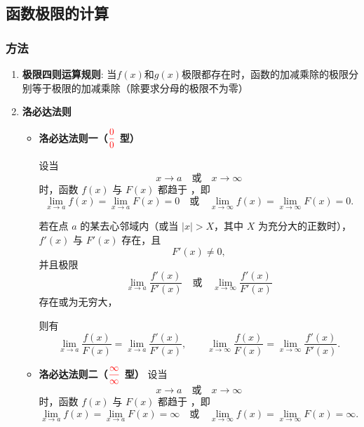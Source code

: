 \documentclass[../book.tex]{subfiles}
\begin{document}
    \subsection{函数极限的计算}

    \subsubsection{方法}

    \begin{enumerate}
        \item \textbf{极限四则运算规则}: 当$f(x)$和$g(x)$极限都存在时，函数的加减乘除的极限分别等于极限的加减乘除（除要求分母的极限不为零）
        \item \textbf{洛必达法则}
        \begin{itemize}
            \item \textbf{洛必达法则一（$\color{red}{\dfrac{0}{0}}$ 型）}

            设当
            \[
                x \to a \quad \text{或} \quad x \to \infty
            \]
            时，函数 $f(x)$ 与 $F(x)$ 都趋于 {\color{red}{0}}，即
            \[
                \lim_{x\to a} f(x) = \lim_{x\to a} F(x) = 0
                \quad \text{或} \quad
                \lim_{x\to \infty} f(x) = \lim_{x\to \infty} F(x) = 0.
            \]

            若在点 $a$ 的某去心邻域内（或当 $|x|>X$，其中 $X$ 为充分大的正数时），
            $f'(x)$ 与 $F'(x)$ 存在，且
            \[
                F'(x) \neq 0,
            \]
            并且极限
            \[
                \lim_{x\to a} \frac{f'(x)}{F'(x)}
                \quad \text{或} \quad
                \lim_{x\to \infty} \frac{f'(x)}{F'(x)}
            \]
            存在或为无穷大，

            则有
            \[
                \lim_{x\to a} \frac{f(x)}{F(x)}
                =
                \lim_{x\to a} \frac{f'(x)}{F'(x)},
                \qquad
                \lim_{x\to \infty} \frac{f(x)}{F(x)}
                =
                \lim_{x\to \infty} \frac{f'(x)}{F'(x)}.
            \]
            \item \textbf{洛必达法则二（$\color{red}{\dfrac{\infty}{\infty}}$ 型）}
            设当
            \[
                x \to a \quad \text{或} \quad x \to \infty
            \]
            时，函数 $f(x)$ 与 $F(x)$ 都趋于 {\color{red}{无穷大}}，即
            \[
                \lim_{x\to a} f(x) = \lim_{x\to a} F(x) = \infty
                \quad \text{或} \quad
                \lim_{x\to \infty} f(x) = \lim_{x\to \infty} F(x) = \infty.
            \]


\end{itemize}
\end{enumerate}
\end{document}
